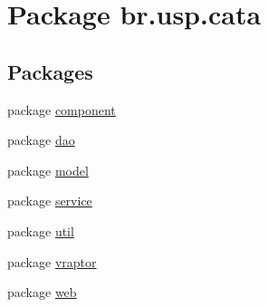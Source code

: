 \hypertarget{namespacebr_1_1usp_1_1cata}{\section{Package br.\+usp.\+cata}
\label{namespacebr_1_1usp_1_1cata}
}
\subsection*{Packages}
\begin{DoxyCompactItemize}
\item 
package \hyperlink{namespacebr_1_1usp_1_1cata_1_1component}{component}
\item 
package \hyperlink{namespacebr_1_1usp_1_1cata_1_1dao}{dao}
\item 
package \hyperlink{namespacebr_1_1usp_1_1cata_1_1model}{model}
\item 
package \hyperlink{namespacebr_1_1usp_1_1cata_1_1service}{service}
\item 
package \hyperlink{namespacebr_1_1usp_1_1cata_1_1util}{util}
\item 
package \hyperlink{namespacebr_1_1usp_1_1cata_1_1vraptor}{vraptor}
\item 
package \hyperlink{namespacebr_1_1usp_1_1cata_1_1web}{web}
\end{DoxyCompactItemize}
